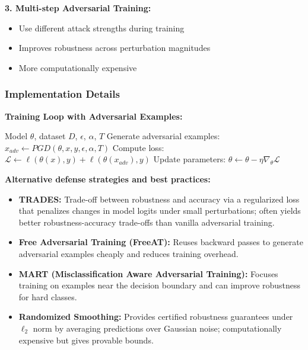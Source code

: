 \documentclass[conference]{IEEEtran}
\begin{document}
\textbf{3. Multi-step Adversarial Training:}
\begin{itemize}
  \item Use different attack strengths during training
  \item Improves robustness across perturbation magnitudes
  \item More computationally expensive
\end{itemize}

\subsubsection{Implementation Details}
\label{sec:q4_adv_training_impl}

\textbf{Training Loop with Adversarial Examples:}

\begin{algorithm}[H]
\caption{Adversarial Training Loop}
\begin{algorithmic}[1]
\Require Model $\theta$, dataset $D$, $\epsilon$, $\alpha$, $T$
    \State Generate adversarial examples: $x_{adv} \leftarrow PGD(\theta, x, y, \epsilon, \alpha, T)$
    \State Compute loss: $\mathcal{L} \leftarrow \ell(\theta(x), y) + \ell(\theta(x_{adv}), y)$
    \State Update parameters: $\theta \leftarrow \theta - \eta \nabla_\theta \mathcal{L}$
  \EndFor
\EndFor
\end{algorithmic}
\end{algorithm}

\textbf{Alternative defense strategies and best practices:}
\begin{itemize}
  \item \textbf{TRADES:} Trade-off between robustness and accuracy via a regularized loss that penalizes changes in model logits under small perturbations; often yields better robustness-accuracy trade-offs than vanilla adversarial training.
  \item \textbf{Free Adversarial Training (FreeAT):} Reuses backward passes to generate adversarial examples cheaply and reduces training overhead.
  \item \textbf{MART (Misclassification Aware Adversarial Training):} Focuses training on examples near the decision boundary and can improve robustness for hard classes.
  \item \textbf{Randomized Smoothing:} Provides certified robustness guarantees under $\ell_2$ norm by averaging predictions over Gaussian noise; computationally expensive but gives provable bounds.
\end{itemize}
\end{document}
